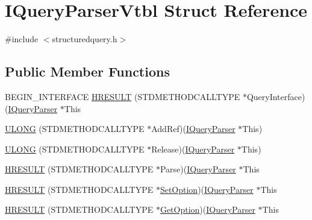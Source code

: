 \hypertarget{struct_i_query_parser_vtbl}{}\section{I\+Query\+Parser\+Vtbl Struct Reference}
\label{struct_i_query_parser_vtbl}


{\ttfamily \#include $<$structuredquery.\+h$>$}

\subsection*{Public Member Functions}
\begin{DoxyCompactItemize}
\item 
B\+E\+G\+I\+N\+\_\+\+I\+N\+T\+E\+R\+F\+A\+CE \hyperlink{struct_i_query_parser_vtbl_a1f04ac2a79519629fdfb9695388bd13d}{H\+R\+E\+S\+U\+LT} (S\+T\+D\+M\+E\+T\+H\+O\+D\+C\+A\+L\+L\+T\+Y\+PE $\ast$Query\+Interface)(\hyperlink{structuredquery_8h_ac6bf6a3bb0538d5785821c0c7e2081e5}{I\+Query\+Parser} $\ast$This
\item 
\hyperlink{struct_i_query_parser_vtbl_a382077fd00d1ae1595e5db50bf2b6591}{U\+L\+O\+NG} (S\+T\+D\+M\+E\+T\+H\+O\+D\+C\+A\+L\+L\+T\+Y\+PE $\ast$Add\+Ref)(\hyperlink{structuredquery_8h_ac6bf6a3bb0538d5785821c0c7e2081e5}{I\+Query\+Parser} $\ast$This)
\item 
\hyperlink{struct_i_query_parser_vtbl_ab0b091929d56c66dc12d0c5c587f1ce4}{U\+L\+O\+NG} (S\+T\+D\+M\+E\+T\+H\+O\+D\+C\+A\+L\+L\+T\+Y\+PE $\ast$Release)(\hyperlink{structuredquery_8h_ac6bf6a3bb0538d5785821c0c7e2081e5}{I\+Query\+Parser} $\ast$This)
\item 
\hyperlink{struct_i_query_parser_vtbl_a30655cbf99f14c58e4e4d74c4c591d7e}{H\+R\+E\+S\+U\+LT} (S\+T\+D\+M\+E\+T\+H\+O\+D\+C\+A\+L\+L\+T\+Y\+PE $\ast$Parse)(\hyperlink{structuredquery_8h_ac6bf6a3bb0538d5785821c0c7e2081e5}{I\+Query\+Parser} $\ast$This
\item 
\hyperlink{struct_i_query_parser_vtbl_a362796c2572f76ba013eedcbf2f09090}{H\+R\+E\+S\+U\+LT} (S\+T\+D\+M\+E\+T\+H\+O\+D\+C\+A\+L\+L\+T\+Y\+PE $\ast$\hyperlink{_track_panel_8cpp_afe73cd8abf3b46ca6b5501768ad042f2}{Set\+Option})(\hyperlink{structuredquery_8h_ac6bf6a3bb0538d5785821c0c7e2081e5}{I\+Query\+Parser} $\ast$This
\item 
\hyperlink{struct_i_query_parser_vtbl_aaed1520f97b60492f275443f573b6f5a}{H\+R\+E\+S\+U\+LT} (S\+T\+D\+M\+E\+T\+H\+O\+D\+C\+A\+L\+L\+T\+Y\+PE $\ast$\hyperlink{portburn__winxp_8cpp_a318876f73675fe857d5f75e4dc4f1bf7}{Get\+Option})(\hyperlink{structuredquery_8h_ac6bf6a3bb0538d5785821c0c7e2081e5}{I\+Query\+Parser} $\ast$This

\end{DoxyCompactItemize}
